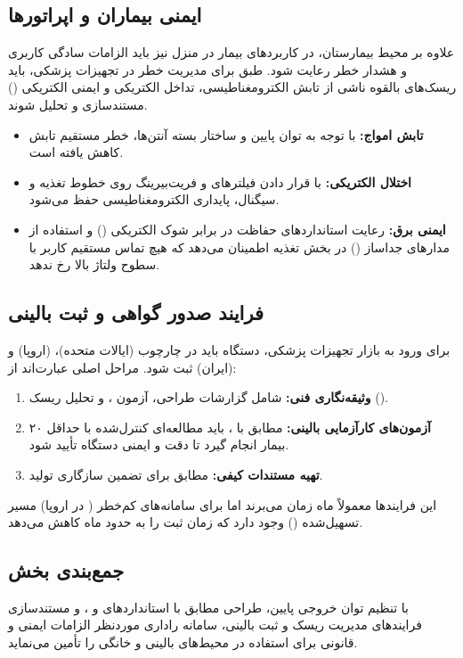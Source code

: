 \subsection{ایمنی بیماران و اپراتورها}
\label{sec:patient-operator-safety}

علاوه بر محیط بیمارستان، در کاربردهای بیمار در منزل نیز باید الزامات سادگی کاربری و هشدار خطر رعایت شود. طبق  برای مدیریت خطر در تجهیزات پزشکی، باید ریسک‌های بالقوه ناشی از تابش الکترومغناطیسی، تداخل الکتریکی و ایمنی الکتریکی () مستندسازی و تحلیل شوند.

\begin{itemize}
  \item \textbf{تابش امواج:} با توجه به توان پایین و ساختار بسته آنتن‌ها، خطر مستقیم تابش کاهش یافته است.
  \item \textbf{اختلال الکتریکی:} با قرار دادن فیلترهای  و فریت‌بیرینگ روی خطوط تغذیه و سیگنال، پایداری الکترومغناطیسی حفظ می‌شود.
  \item \textbf{ایمنی برق:} رعایت استانداردهای حفاظت در برابر شوک الکتریکی () و استفاده از مدارهای جداساز () در بخش تغذیه  اطمینان می‌دهد که هیچ تماس مستقیم کاربر با سطوح ولتاژ بالا رخ ندهد.
\end{itemize}

\subsection{فرایند صدور گواهی و ثبت بالینی}
\label{sec:certification-process}

برای ورود به بازار تجهیزات پزشکی، دستگاه باید در چارچوب  (ایالات متحده)،  (اروپا) و  (ایران) ثبت شود. مراحل اصلی عبارت‌اند از:

\begin{enumerate}
  \item \textbf{وثیقه‌نگاری فنی:} شامل گزارشات طراحی، آزمون ،  و تحلیل ریسک ().
  \item \textbf{آزمون‌های کارآزمایی بالینی:} مطابق با ، باید مطالعه‌ای کنترل‌شده با حداقل ۲۰ بیمار انجام گیرد تا دقت و ایمنی دستگاه تأیید شود.
  \item \textbf{تهیه مستندات کیفی:}  مطابق  برای تضمین سازگاری تولید.
\end{enumerate}

این فرایندها معمولاً  ماه زمان می‌برند اما برای سامانه‌های کم‌خطر ( در اروپا) مسیر تسهیل‌شده () وجود دارد که زمان ثبت را به حدود  ماه کاهش می‌دهد.

\subsection*{جمع‌بندی بخش}
\label{sec:safety-summary}

با تنظیم توان خروجی پایین، طراحی مطابق با استانداردهای  و ، و مستندسازی فرایندهای مدیریت ریسک و ثبت بالینی، سامانه راداری موردنظر الزامات ایمنی و قانونی برای استفاده در محیط‌های بالینی و خانگی را تأمین می‌نماید.
